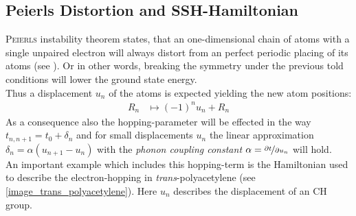 \subsection{Peierls Distortion and SSH-Hamiltonian}
\label{chapter_Peierls_SSH}
\textsc{Peierls} instability theorem states, that an one-dimensional chain of atoms with a single unpaired electron will always distort from an perfect periodic placing of its atoms (see \cite{chandrasekhar,nalwa}). Or in other words, breaking the symmetry under the previous told conditions will lower the ground state energy.\\
Thus a displacement $u_n$ of the atoms is expected yielding the new atom positions:
\begin{align}
	R_n &\mapsto (-1)^{n}u_n + R_n
\end{align}
As a consequence also the hopping-parameter will be effected in the way $t_{n, n+1} = t_0 + \delta_n$ and for small displacements $u_n$ the linear approximation $\delta_n = \alpha (u_{n+1} - u_n)$ with the \emph{phonon coupling constant} $\alpha = \nicefrac{\partial t}{\partial u_n}$ will hold.\\
An important example which includes this hopping-term is the Hamiltonian used to describe the electron-hopping in \emph{trans}-polyacetylene (see \cref{image_trans_polyacetylene}). Here $u_n$ describes the displacement of an CH group.\\
